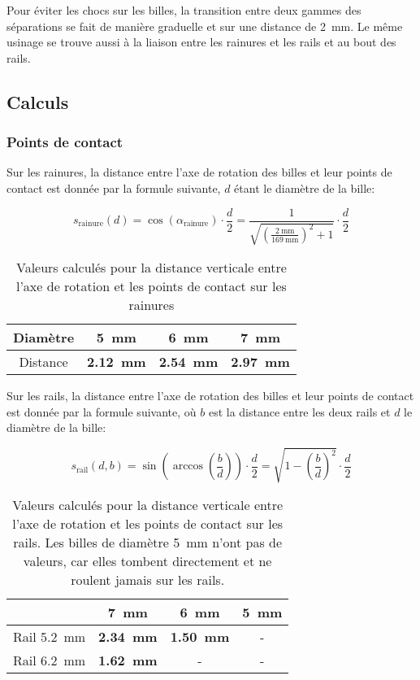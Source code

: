 Pour éviter les chocs sur les billes, la transition entre deux gammes des séparations se fait de manière graduelle et sur une distance de \SI{2}{\mm}. Le même usinage se trouve aussi à la liaison entre les rainures et les rails et au bout des rails.

\subsection{Calculs}
\label{calculs_tri}
\subsubsection{Points de contact}
Sur les rainures, la distance entre l'axe de rotation des billes et leur points de contact est donnée par la formule suivante, $d$ étant le diamètre de la bille:

\[s_{\text{rainure}}(d) = \cos(\alpha_{\text{rainure}}) \cdot \frac{d}{2} = \frac{1}{\sqrt{\left(\frac{\SI{2}{\milli\metre}}{\SI{169}{\milli\metre}}\right)^2+1}} \cdot \frac{d}{2}\]

\begin{table}[htbp]
    \centering
    \begin{tabular}{|c|c|c|c|}
        \hline
        Diamètre    & \SI{5}{\mm} & \SI{6}{\mm} & \SI{7}{\mm} \\
        \hline
        Distance    & \textbf{\SI{2.12}{\mm}} & \textbf{\SI{2.54}{\mm}} & \textbf{\SI{2.97}{\mm}} \\
        \hline
    \end{tabular}
    \caption{Valeurs calculés pour la distance verticale entre l'axe de rotation et les points de contact sur les rainures}
    \label{tab:distance_rainures}
\end{table}

Sur les rails, la distance entre l'axe de rotation des billes et leur points de contact est donnée par la formule suivante, où $b$ est la distance entre les deux rails et $d$ le diamètre de la bille:


\[s_{\text{rail}}(d,b) = \sin\left(\arccos\left(\frac{b}{d}\right)\right) \cdot \frac{d}{2} = \sqrt{1-\left(\frac{b}{d}\right)^{2}} \cdot \frac{d}{2}\]

\begin{table}[htbp]
    \centering
    \begin{tabular}{|c|c|c|c|}
        \hline
         & \SI{7}{\mm} & \SI{6}{\mm} & \SI{5}{\mm} \\
        \hline
        Rail \SI{5.2}{\mm}& \textbf{\SI{2.34}{\mm}} & \textbf{\SI{1.50}{\mm}} & - \\
        \hline
        Rail \SI{6.2}{\mm}& \textbf{\SI{1.62}{\mm}} & - & - \\
        \hline
    \end{tabular}
    \caption{Valeurs calculés pour la distance verticale entre l'axe de rotation et les points de contact sur les rails. Les billes de diamètre \SI{5}{\mm} n'ont pas de valeurs, car elles tombent directement et ne roulent jamais sur les rails.}
    \label{tab:distance_rails}
\end{table}

